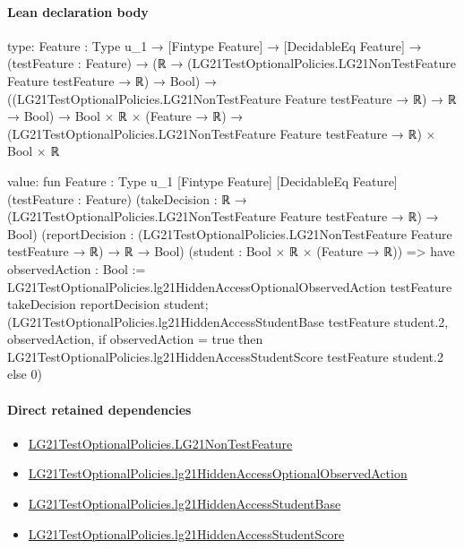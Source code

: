 \documentclass[10pt]{article}
\begin{document}
\paragraph{Lean declaration body}
\begin{ReviewVerbatim}
type:
{Feature : Type u_1} →
  [Fintype Feature] →
    [DecidableEq Feature] →
      (testFeature : Feature) →
        (ℝ → (LG21TestOptionalPolicies.LG21NonTestFeature Feature testFeature → ℝ) → Bool) →
          ((LG21TestOptionalPolicies.LG21NonTestFeature Feature testFeature → ℝ) → ℝ → Bool) →
            Bool × ℝ × (Feature → ℝ) → (LG21TestOptionalPolicies.LG21NonTestFeature Feature testFeature → ℝ) × Bool × ℝ

value:
fun {Feature : Type u_1} [Fintype Feature] [DecidableEq Feature] (testFeature : Feature)
    (takeDecision : ℝ → (LG21TestOptionalPolicies.LG21NonTestFeature Feature testFeature → ℝ) → Bool)
    (reportDecision : (LG21TestOptionalPolicies.LG21NonTestFeature Feature testFeature → ℝ) → ℝ → Bool)
    (student : Bool × ℝ × (Feature → ℝ)) =>
  have observedAction : Bool :=
    LG21TestOptionalPolicies.lg21HiddenAccessOptionalObservedAction testFeature takeDecision reportDecision student;
  (LG21TestOptionalPolicies.lg21HiddenAccessStudentBase testFeature student.2, observedAction,
    if observedAction = true then LG21TestOptionalPolicies.lg21HiddenAccessStudentScore testFeature student.2 else 0)
\end{ReviewVerbatim}

\paragraph{Direct retained dependencies}
\begin{itemize}\raggedright
\item \hyperlink{governing-declaration-81cb73bf3869c56d}{LG21\allowbreak{}Test\allowbreak{}Optional\allowbreak{}Policies.\allowbreak{}LG21\allowbreak{}Non\allowbreak{}Test\allowbreak{}Feature}
\item \hyperlink{governing-declaration-9bc3baddc531e901}{LG21\allowbreak{}Test\allowbreak{}Optional\allowbreak{}Policies.\allowbreak{}lg21\allowbreak{}Hidden\allowbreak{}Access\allowbreak{}Optional\allowbreak{}Observed\allowbreak{}Action}
\item \hyperlink{governing-declaration-10af39de5a9d1826}{LG21\allowbreak{}Test\allowbreak{}Optional\allowbreak{}Policies.\allowbreak{}lg21\allowbreak{}Hidden\allowbreak{}Access\allowbreak{}Student\allowbreak{}Base}
\item \hyperlink{governing-declaration-e4d0c619bb8c334b}{LG21\allowbreak{}Test\allowbreak{}Optional\allowbreak{}Policies.\allowbreak{}lg21\allowbreak{}Hidden\allowbreak{}Access\allowbreak{}Student\allowbreak{}Score}
\end{itemize}
\hypertarget{governing-declaration-b9d86f31a9fb5365}{}
\end{document}
